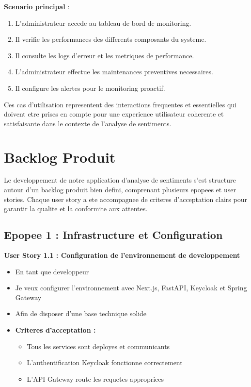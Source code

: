 \textbf{Scenario principal} :
\begin{enumerate}
    \item L'administrateur accede au tableau de bord de monitoring.
    \item Il verifie les performances des differents composants du systeme.
    \item Il consulte les logs d'erreur et les metriques de performance.
    \item L'administrateur effectue les maintenances preventives necessaires.
    \item Il configure les alertes pour le monitoring proactif.
\end{enumerate}

Ces cas d'utilisation representent des interactions frequentes et essentielles qui doivent etre prises en compte pour une experience utilisateur coherente et satisfaisante dans le contexte de l'analyse de sentiments.

\section{Backlog Produit}

Le developpement de notre application d'analyse de sentiments s'est structure autour d'un backlog produit bien defini, comprenant plusieurs epopees et user stories. Chaque user story a ete accompagnee de criteres d'acceptation clairs pour garantir la qualite et la conformite aux attentes.

\subsection{Epopee 1 : Infrastructure et Configuration}

\textbf{User Story 1.1 : Configuration de l'environnement de developpement}
\begin{itemize}
    \item En tant que developpeur
    \item Je veux configurer l'environnement avec Next.js, FastAPI, Keycloak et Spring Gateway
    \item Afin de disposer d'une base technique solide
    \item \textbf{Criteres d'acceptation :}
    \begin{itemize}
        \item Tous les services sont deployes et communicants
        \item L'authentification Keycloak fonctionne correctement
        \item L'API Gateway route les requetes appropriees
    \end{itemize}
\end{itemize}

